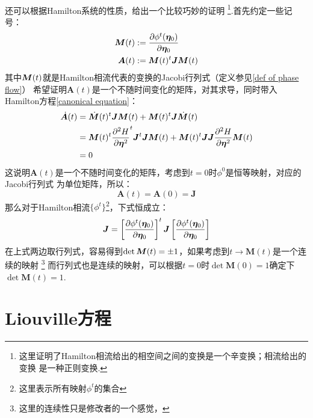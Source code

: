     \paragraph{}
    还可以根据Hamilton系统的性质，给出一个比较巧妙的证明
    \footnote{
        这里证明了Hamilton相流给出的相空间之间的变换是一个辛变换；相流给出的变换
        是一种正则变换.
    }.首先约定一些记号：
    \begin{equation}
        \begin{split}
            \bm{M}(t) &:= \frac{\partial{\phi^t(\bm{\eta}_0)}}{\partial{\bm{\eta}_0}}\\
            \bm{A}(t) &:= \bm{M}(t)^t\bm{J}\bm{M}(t)
        \end{split}
    \end{equation}
    其中$\displaystyle\bm{M}(t)$就是Hamilton相流代表的变换的Jacobi行列式（定义参见\ref{def of phase flow}）
    希望证明$\bm{A}(t)$是一个不随时间变化的矩阵，对其求导，同时带入Hamilton方程\ref{canonical equation}：
    \begin{equation}
        \begin{split}
            \dot{\bm{A}}(t) &= \dot{\bm{M}}(t)^t\bm{J}\bm{M}(t) + \bm{M}(t)^t\bm{J}\dot{\bm{M}}(t)\\
            &= \bm{M}(t)^t\frac{\partial{^2 H}}{\partial{\bm{\eta}^2}}^t \bm{J}^t\bm{J}\bm{M}(t) + \bm{M}(t)^t\bm{J}\bm{J}
            \frac{\partial{^2 H}}{\partial{\bm{\eta}^2}}\bm{M}(t)\\
            &= 0
        \end{split}
    \end{equation}
    这说明$\bm{A}(t)$是一个不随时间变化的矩阵，考虑到$t=0$时$\phi^0$是恒等映射，对应的Jacobi行列式
    为单位矩阵，所以：
    \begin{equation}
        \bm{A}(t) = \bm{A}(0) = \bm{J}
    \end{equation}
    那么对于Hamilton相流$\{\phi^t\}$\footnote{这里表示所有映射$\phi^t$的集合}，下式恒成立：
    \begin{equation}
        \bm{J} = \left[\frac{\partial{\phi^t(\bm{\eta}_0)}}{\partial{\bm{\eta}_0}}\right]^t \bm{J} \left[\frac{\partial{\phi^t(\bm{\eta}_0)}}{\partial{\bm{\eta}_0}}\right]
    \end{equation}
    在上式两边取行列式，容易得到$\displaystyle\det\bm{M}(t) = \pm 1$，如果考虑到$t\to\bm{M}(t)$是一个连续的映射
    \footnote{这里的连续性只是修改者的一个感觉，}
    而行列式也是连续的映射，可以根据$t=0$时$\det\bm{M}(0) = 1$确定下$\det\bm{M}(t) = 1$.
    
    \section{Liouville方程}
